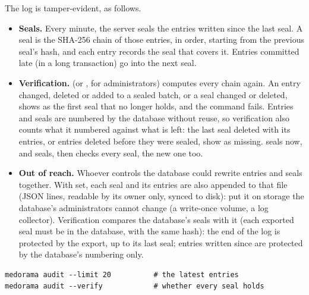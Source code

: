The log is tamper-evident, as follows.
\begin{itemize}
\item \textbf{Seals.} Every minute, the server seals the entries written since the last seal. A
  seal is the SHA-256 chain of those entries, in order, starting from the previous seal's hash,
  and each entry records the seal that covers it. Entries committed late (in a long transaction) go
  into the next seal.
\item \textbf{Verification.}  (or , for
  administrators) computes every chain again. An entry changed, deleted or added to a sealed batch, or a
  seal changed or deleted, shows as the first seal that no longer holds, and the command fails.
  Entries and seals are numbered by the database without reuse, so verification also counts
  what it numbered against what is left: the last seal deleted with its entries, or entries
  deleted before they were sealed, show as missing.
   seals now, and  seals,
  then checks every seal, the new one too.
\item \textbf{Out of reach.} Whoever controls the database could rewrite entries and seals
  together. With  set, each seal and its entries are also appended to that
  file (JSON lines, readable by its owner only, synced to disk): put it on storage the database's
  administrators cannot change (a write-once volume, a log collector). Verification compares the
  database's seals with it (each exported seal must be in the database, with the same hash): the
  end of the log is protected by the export, up to its last seal; entries written since are
  protected by the database's numbering only.
\end{itemize}
\begin{lstlisting}[style=shell]
medorama audit --limit 20          # the latest entries
medorama audit --verify            # whether every seal holds
\end{lstlisting}
